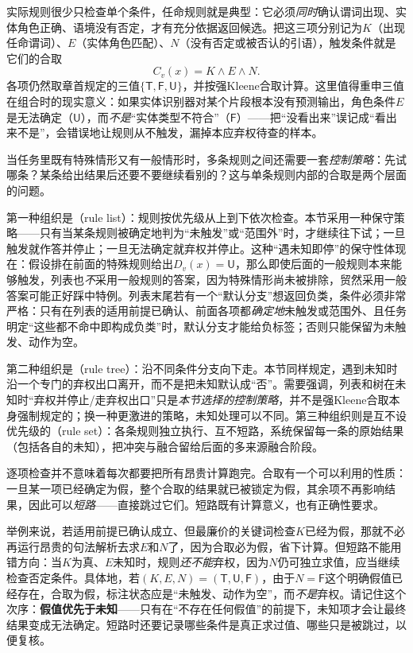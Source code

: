 实际规则很少只检查单个条件，任命规则就是典型：它必须\emph{同时}确认谓词出现、实体角色正确、语境没有否定，才有充分依据返回候选。把这三项分别记为$K$（出现任命谓词）、$E$（实体角色匹配）、$N$（没有否定或被否认的引语），触发条件就是它们的合取
\[
  C_v(x)=K\land E\land N.
\]
各项仍然取章首规定的三值$\{\mathsf{T},\mathsf{F},\mathsf{U}\}$，并按强Kleene合取计算。这里值得重申三值在组合时的现实意义：如果实体识别器对某个片段根本没有预测输出，角色条件$E$是无法确定（$\mathsf{U}$），而\emph{不是}“实体类型不符合”（$\mathsf{F}$）——把“没看出来”误记成“看出来不是”，会错误地让规则从不触发，漏掉本应弃权待查的样本。

当任务里既有特殊情形又有一般情形时，多条规则之间还需要一套\emph{控制策略}：先试哪条？某条给出结果后还要不要继续看别的？这与单条规则内部的合取是两个层面的问题。

第一种组织是（rule list）：规则按优先级从上到下依次检查。本节采用一种保守策略——只有当某条规则被确定地判为“未触发”或“范围外”时，才继续往下试；一旦触发就作答并停止；一旦无法确定就弃权并停止。这种“遇未知即停”的保守性体现在：假设排在前面的特殊规则给出$D_v(x)=\mathsf{U}$，那么即使后面的一般规则本来能够触发，列表也\emph{不}采用一般规则的答案，因为特殊情形尚未被排除，贸然采用一般答案可能正好踩中特例。列表末尾若有一个“默认分支”想返回负类，条件必须非常严格：只有在列表的适用前提已确认、前面各项都\emph{确定地}未触发或范围外、且任务明定“这些都不命中即构成负类”时，默认分支才能给负标签；否则只能保留为未触发、动作为空。

第二种组织是（rule tree）：沿不同条件分支向下走。本节同样规定，遇到未知时沿一个专门的弃权出口离开，而不是把未知默认成“否”。需要强调，列表和树在未知时“弃权并停止/走弃权出口”只是\emph{本节选择的控制策略}，并不是强Kleene合取本身强制规定的；换一种更激进的策略，未知处理可以不同。第三种组织则是互不设优先级的（rule set）：各条规则独立执行、互不短路，系统保留每一条的原始结果（包括各自的未知），把冲突与融合留给后面的多来源融合阶段。

逐项检查并不意味着每次都要把所有昂贵计算跑完。合取有一个可以利用的性质：一旦某一项已经确定为假，整个合取的结果就已被锁定为假，其余项不再影响结果，因此可以\emph{短路}——直接跳过它们。短路既有计算意义，也有正确性要求。

举例来说，若适用前提已确认成立、但最廉价的关键词检查$K$已经为假，那就不必再运行昂贵的句法解析去求$E$和$N$了，因为合取必为假，省下计算。但短路不能用错方向：当$K$为真、$E$未知时，规则\emph{还不能}弃权，因为$N$仍可独立求值，应当继续检查否定条件。具体地，若$(K,E,N)=(\mathsf{T},\mathsf{U},\mathsf{F})$，由于$N=\mathsf{F}$这个明确假值已经存在，合取为假，标注状态应是“未触发、动作为空”，而\emph{不是}弃权。请记住这个次序：\textbf{假值优先于未知}——只有在“不存在任何假值”的前提下，未知项才会让最终结果变成无法确定。短路时还要记录哪些条件是真正求过值、哪些只是被跳过，以便复核。

